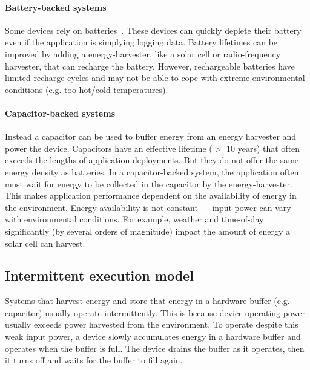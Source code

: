\paragraph{Battery-backed systems}
Some devices rely on batteries~\cite{culler2002mica,jackson_2019,rowe2011sensor}.
% 
These devices can quickly deplete their battery even if the application is simplying logging data.
% 
Battery lifetimes can be improved by adding a energy-harvester, like a solar cell or radio-frequency harvester, that can recharge the battery.
% 
However, rechargeable batteries have limited recharge cycles and may not be able to cope with extreme environmental conditions (e.g. too hot/cold temperatures).

\paragraph{Capacitor-backed systems}
Instead a capacitor can be used to buffer energy from an energy harvester and power the device.
% 
Capacitors have an effective lifetime ($>$ 10 years) that often exceeds the lengths of application deployments.
% 
But they do not offer the same energy density as batteries.
% 
In a capacitor-backed system, the application often must wait for energy to be collected in the capacitor by the energy-harvester.
% 
This makes application performance dependent on the availability of energy in the environment.
% 
Energy availability is not constant --- input power can vary with environmental conditions.
% 
For example, weather and time-of-day significantly (by several orders of magnitude) impact the amount of energy a solar cell can harvest.

\subsection{Intermittent execution model}
\label{chapter:background:intermittent}
Systems that harvest energy and store that energy in a hardware-buffer (e.g. capacitor) usually operate intermittently.
% 
This is because device operating power usually exceeds power harvested from the environment.
% 
To operate despite this weak input power, a device slowly accumulates energy in a hardware buffer and operates when the buffer is full. 
% 
The device drains the buffer as it operates, then it turns off and waits for the buffer to fill again.
% 

